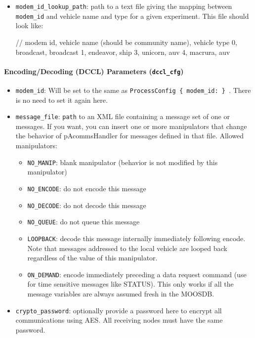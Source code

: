 \documentclass[11pt, letterpaper, oneside]{memoir}
\begin{document}
\begin{itemize}
\item \verb|modem_id_lookup_path|: path to a text file giving the mapping between \verb|modem_id| and vehicle name and type for a given experiment. This file should look like:
\begin{boxedverbatim}
// modem id, vehicle name (should be community name), vehicle type
0, broadcast, broadcast
1, endeavor, ship
3, unicorn, auv
4, macrura, auv
\end{boxedverbatim}
\resetbvlinenumber
\end{itemize}


\paragraph{Encoding/Decoding (DCCL) Parameters (\texttt{dccl\_cfg})} \label{dccl_param}
\begin{itemize}
\item \verb|modem_id|: Will be set to the same as \verb|ProcessConfig { modem_id: } |. There is no need to set it again here.
\item \verb|message_file|: \verb|path| to an XML file containing a message set of one or messages. If you want, you can insert one or more manipulators that change the behavior of pAcommsHandler for messages defined in that file. Allowed manipulators:
\begin{itemize}
\item \verb|NO_MANIP|: blank manipulator (behavior is not modified by this manipulator)
\item \verb|NO_ENCODE|: do not encode this message
\item \verb|NO_DECODE|: do not decode this message
\item \verb|NO_QUEUE|: do not queue this message
\item \verb|LOOPBACK|: decode this message internally immediately following encode. Note that messages addressed to the local vehicle are looped back regardless of the value of this manipulator.
\item \verb|ON_DEMAND|: encode immediately preceding  a data request command (use for time sensitive messages like STATUS). This only works if all the message variables are always assumed fresh in the MOOSDB.
\end{itemize}
\item \verb|crypto_password|: optionally provide a password here to encrypt all communications using AES. All receiving nodes must have the same password.
\end{itemize}
\end{document}
